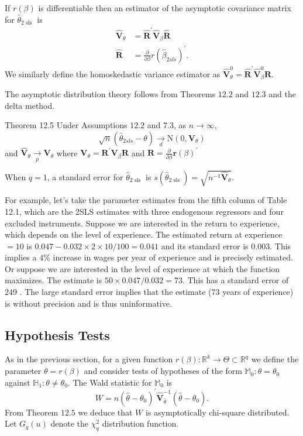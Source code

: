 \documentclass[10pt]{article}
\begin{document}
If $r(\beta)$ is differentiable then an estimator of the asymptotic covariance matrix for $\widehat{\theta}_{2 \text { sls }}$ is
$$
\begin{aligned}
\widehat{\boldsymbol{V}}_{\theta} &=\widehat{\boldsymbol{R}}^{\prime} \widehat{\boldsymbol{V}}_{\beta} \widehat{\boldsymbol{R}} \\
\widehat{\boldsymbol{R}} &=\frac{\partial}{\partial \beta} r\left(\widehat{\beta}_{2 s l s}\right)^{\prime} .
\end{aligned}
$$
We similarly define the homoskedastic variance estimator as $\widehat{\boldsymbol{V}}_{\theta}^{0}=\widehat{\boldsymbol{R}}^{\prime} \widehat{\boldsymbol{V}}_{\beta}^{0} \widehat{\boldsymbol{R}}$.

The asymptotic distribution theory follows from Theorems $12.2$ and $12.3$ and the delta method.

Theorem 12.5 Under Assumptions $12.2$ and $7.3$, as $n \rightarrow \infty$,
$$
\sqrt{n}\left(\widehat{\theta}_{2 s l s}-\theta\right) \underset{d}{\longrightarrow} \mathrm{N}\left(0, \boldsymbol{V}_{\theta}\right)
$$
and $\widehat{\boldsymbol{V}}_{\theta} \underset{p}{\longrightarrow} \boldsymbol{V}_{\theta}$ where $\boldsymbol{V}_{\theta}=\boldsymbol{R}^{\prime} \boldsymbol{V}_{\beta} \boldsymbol{R}$ and $\boldsymbol{R}=\frac{\partial}{\partial \beta} \boldsymbol{r}(\beta)^{\prime}$

When $q=1$, a standard error for $\widehat{\theta}_{2 \text { sls }}$ is $s\left(\widehat{\theta}_{2 \text { sls }}\right)=\sqrt{n^{-1} \widehat{\boldsymbol{V}}_{\theta}}$.

For example, let's take the parameter estimates from the fifth column of Table 12.1, which are the 2SLS estimates with three endogenous regressors and four excluded instruments. Suppose we are interested in the return to experience, which depends on the level of experience. The estimated return at experience $=10$ is $0.047-0.032 \times 2 \times 10 / 100=0.041$ and its standard error is $0.003$. This implies a $4 \%$ increase in wages per year of experience and is precisely estimated. Or suppose we are interested in the level of experience at which the function maximizes. The estimate is $50 \times 0.047 / 0.032=73$. This has a standard error of 249 . The large standard error implies that the estimate (73 years of experience) is without precision and is thus uninformative.

\subsection{Hypothesis Tests}
As in the previous section, for a given function $r(\beta): \mathbb{R}^{k} \rightarrow \Theta \subset \mathbb{R}^{q}$ we define the parameter $\theta=r(\beta)$ and consider tests of hypotheses of the form $\mathbb{M}_{0}: \theta=\theta_{0}$ against $\mathbb{H}_{1}: \theta \neq \theta_{0}$. The Wald statistic for $\mathbb{M}_{0}$ is
$$
W=n\left(\widehat{\theta}-\theta_{0}\right)^{\prime} \widehat{\boldsymbol{V}}_{\widehat{\theta}}^{-1}\left(\widehat{\theta}-\theta_{0}\right) .
$$
From Theorem $12.5$ we deduce that $W$ is asymptotically chi-square distributed. Let $G_{q}(u)$ denote the $\chi_{q}^{2}$ distribution function.
\end{document}
